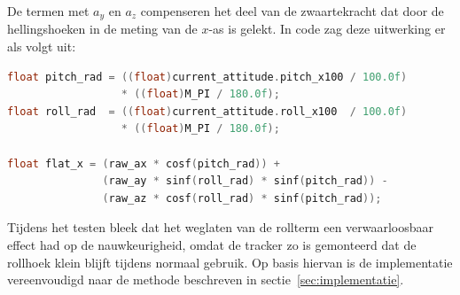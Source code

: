 De termen met $a_y$ en $a_z$ compenseren het deel van de zwaartekracht 
dat door de hellingshoeken in de meting van de $x$-as is gelekt. In 
code zag deze uitwerking er als volgt uit:

\begin{lstlisting}[language=C]
float pitch_rad = ((float)current_attitude.pitch_x100 / 100.0f)
                  * ((float)M_PI / 180.0f);
float roll_rad  = ((float)current_attitude.roll_x100  / 100.0f)
                  * ((float)M_PI / 180.0f);

float flat_x = (raw_ax * cosf(pitch_rad)) +
               (raw_ay * sinf(roll_rad) * sinf(pitch_rad)) -
               (raw_az * cosf(roll_rad) * sinf(pitch_rad));
\end{lstlisting}

Tijdens het testen bleek dat het weglaten van de rollterm een 
verwaarloosbaar effect had op de nauwkeurigheid, omdat de tracker zo 
is gemonteerd dat de rollhoek klein blijft tijdens normaal gebruik. 
Op basis hiervan is de implementatie vereenvoudigd naar de methode 
beschreven in sectie~\ref{sec:implementatie}.